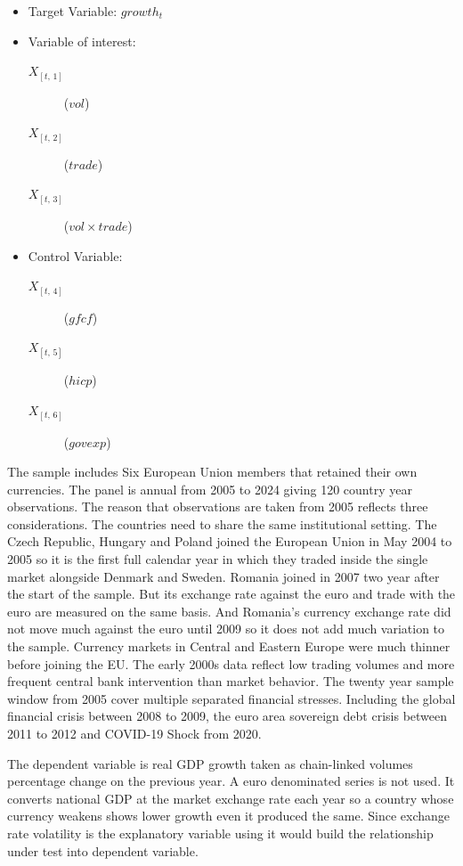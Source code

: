 \begin{itemize}
    \item Target Variable: $growth_{t}$
    \item Variable of interest:
    \begin{description}
        \item[$X_{[t,\,1]}$] ($vol$)
        \item[$X_{[t,\,2]}$] ($trade$)
        \item[$X_{[t,\,3]}$] ($vol \times trade$)
    \end{description}
    \item Control Variable:
    \begin{description}
        \item[$X_{[t,\,4]}$] ($gfcf$)
        \item[$X_{[t,\,5]}$] ($hicp$)
        \item[$X_{[t,\,6]}$] ($govexp$)
    \end{description}
\end{itemize}
The sample includes Six European Union members that retained their own currencies.
The panel is annual from 2005 to 2024 giving 120 country year observations.
The reason that observations are taken from 2005 reflects three considerations.
The countries need to share the same institutional setting.
The Czech Republic, Hungary and Poland joined the European Union in May 2004 to 2005 so it is the first full calendar year in which they traded inside the single market alongside Denmark and Sweden.
Romania joined in 2007 two year after the start of the sample.
But its exchange rate against the euro and trade with the euro are measured on the same basis.
And Romania's currency exchange rate did not move much against the euro until 2009 so it does not add much variation to the sample.
Currency markets in Central and Eastern Europe were much thinner before joining the EU.
The early 2000s data reflect low trading volumes and more frequent central bank intervention than market behavior.
The twenty year sample window from 2005 cover multiple separated financial stresses.
Including the global financial crisis between 2008 to 2009, the euro area sovereign debt crisis between 2011 to 2012 and COVID-19 Shock from 2020.

\vspace{\baselineskip}

The dependent variable is real GDP growth taken as chain-linked volumes percentage change on the previous year.
A euro denominated series is not used.
It converts national GDP at the market exchange rate each year so a country whose currency weakens shows lower growth even it produced the same.
Since exchange rate volatility is the explanatory variable using it would build the relationship under test into dependent variable.

